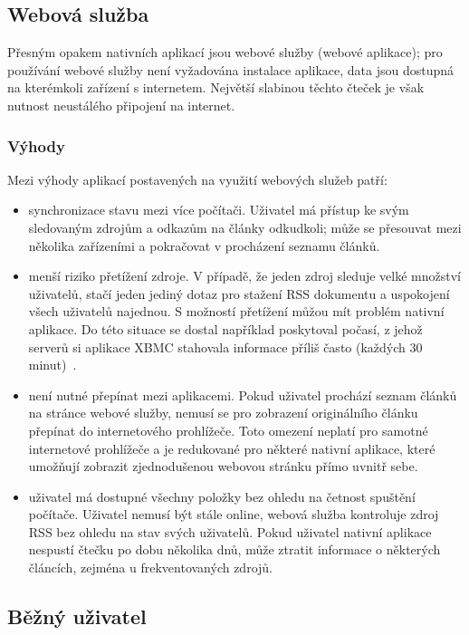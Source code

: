 \subsection{Webová služba}

Přesným opakem nativních aplikací jsou webové služby (webové aplikace); pro používání webové služby není vyžadována instalace aplikace, data jsou dostupná na kterémkoli zařízení s internetem.
Největší slabinou těchto čteček je však nutnost neustálého připojení na internet.

\subsubsection{Výhody}

Mezi výhody aplikací postavených na využití webových služeb patří:
\begin{itemize}
    \item synchronizace stavu mezi více počítači.
        Uživatel má přístup ke svým sledovaným zdrojům a odkazům na články odkudkoli; může se přesouvat mezi několika zařízeními a pokračovat v procházení seznamu článků.
    \item menší riziko přetížení zdroje.
        V případě, že jeden zdroj sleduje velké množství uživatelů, stačí jeden jediný dotaz pro stažení RSS dokumentu a uspokojení všech uživatelů najednou.
        S možností přetížení můžou mít problém nativní aplikace.
		Do této situace se dostal například poskytoval počasí, z jehož serverů si aplikace XBMC stahovala informace příliš často (každých 30 minut)~\cite{xbmc-weather}.
    \item není nutné přepínat mezi aplikacemi.
        Pokud uživatel prochází seznam člán\-ků na stránce webové služby, nemusí se pro zobrazení originálního článku přepínat do internetového prohlížeče.
        Toto omezení neplatí pro samotné internetové prohlížeče a je redukované pro některé nativní aplikace, které umožňují zobrazit zjednodušenou webovou stránku přímo uvnitř sebe.
    \item uživatel má dostupné všechny položky bez ohledu na četnost spuštění počítače.
        Uživatel nemusí být stále online, webová služba kontroluje zdroj RSS bez ohledu na stav svých uživatelů.
        Pokud uživatel nativní aplikace nespustí čtečku po dobu několika dnů, může ztratit informace o některých článcích, zejména u frekventovaných zdrojů.
\end{itemize}

\subsection{Běžný uživatel}

